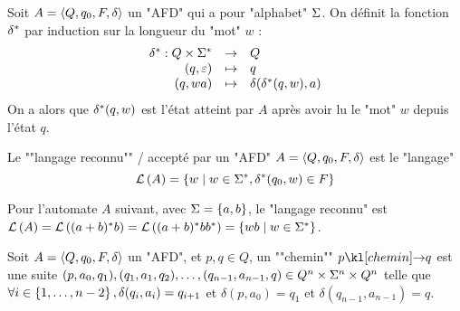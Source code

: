\begin{definition}
	Soit $A = \langle Q, q_0, F, \delta \rangle$ un "AFD" qui a pour "alphabet" $\Sigma$. On définit la fonction $\delta^{*}$ par induction sur la longueur du "mot" $w$ :
	$$ \begin{array}{rcl}
			\delta^{*} : Q \times \Sigma^{*} & \to     & Q                               \\
			(q, \varepsilon)                   & \mapsto & q                               \\
			(q, wa)                         & \mapsto & \delta(\delta^{*}(q, w), a)
		\end{array} $$
	On a alors que $\delta^{*}(q, w)$ est l'état atteint par $A$ après avoir lu le "mot" $w$ depuis l'état $q$.
\end{definition}

\begin{definition}
	Le ""langage reconnu"" / accepté par un "AFD" $A = \langle Q, q_0, F, \delta \rangle$ est le "langage"
	$$ \mathcal{L}\left(A\right) = \left\{w \mid w \in \Sigma^{*}, \delta^{*}(q_0, w) \in F\right\} $$
\end{definition}

\begin{exemple}
	Pour l'automate $A$ suivant, avec $\Sigma = \left\{a,b\right\}$, le "langage reconnu" est
	$\mathcal{L}\left(A\right) = \mathcal{L}\left((a + b)^{*} b\right) = \mathcal{L}\left((a + b)^{*} b b^{*}\right) = \left\{wb \mid w \in \Sigma^{*}\right\}$.

	\begin{center}
		\begin{automata}
		\end{automata}
	\end{center}
\end{exemple}


\begin{definition}[chemin]
	Soit $A = \langle Q, q_0, F, \delta \rangle$ un "AFD", et $p,q \in Q$, un ""chemin"" $p \cheminD q$ est une suite
	$(p, a_0, q_1), (q_1, a_1, q_2), \ldots, (q_{n-1}, a_{n-1}, q)  \in Q^n \times \Sigma^n \times Q^n$
	telle que
	$\forall i \in \left\{1,\ldots,n-2\right\}, \delta(q_i, a_i) = q_{i+1}$ et $\delta(p, a_0) = q_1$ et $\delta(q_{n-1}, a_{n-1}) = q$.
\end{definition}

